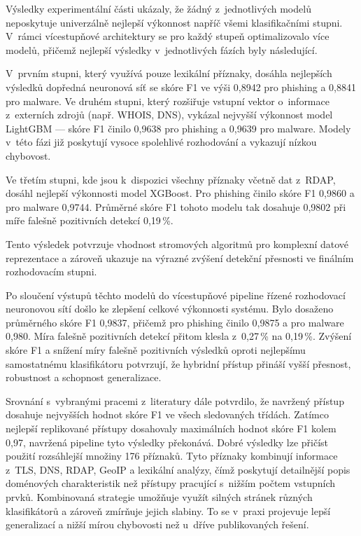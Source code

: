 Výsledky experimentální části ukázaly, že žádný z~jednotlivých modelů neposkytuje univerzálně nejlepší výkonnost napříč všemi klasifikačními stupni. V~rámci vícestupňové architektury se pro každý stupeň optimalizovalo více modelů, přičemž nejlepší výsledky v~jednotlivých fázích byly následující.

V~prvním stupni, který využívá pouze lexikální příznaky, dosáhla nejlepších výsledků dopředná neuronová síť se skóre F1 ve výši 0{,}8942 pro phishing a 0{,}8841 pro malware. Ve druhém stupni, který rozšiřuje vstupní vektor o~informace z~externích zdrojů (např. WHOIS, DNS), vykázal nejvyšší výkonnost model LightGBM — skóre F1 činilo 0{,}9638 pro phishing a 0{,}9639 pro malware. Modely v~této fázi již poskytují vysoce spolehlivé rozhodování a vykazují nízkou chybovost. 

Ve třetím stupni, kde jsou k~dispozici všechny příznaky včetně dat z~RDAP, dosáhl nejlepší výkonnosti model XGBoost. Pro phishing činilo skóre F1 0{,}9860 a pro malware 0{,}9744. Průměrné skóre F1 tohoto modelu tak dosahuje 0{,}9802 při míře falešně pozitivních detekcí 0{,}19\,\%.

Tento výsledek potvrzuje vhodnost stromových algoritmů pro komplexní datové reprezentace a zároveň ukazuje na výrazné zvýšení detekční přesnosti ve finálním rozhodovacím stupni.

Po sloučení výstupů těchto modelů do vícestupňové pipeline řízené rozhodovací neuronovou sítí došlo ke zlepšení celkové výkonnosti systému. Bylo dosaženo průměrného skóre F1 0{,}9837, přičemž pro phishing činilo 0{,}9875 a pro malware 0{,}980. Míra falešně pozitivních detekcí přitom klesla z~0{,}27\,\% na 0{,}19\,\%. Zvýšení skóre F1 a snížení míry falešně pozitivních výsledků oproti nejlepšímu samostatnému klasifikátoru potvrzují, že hybridní přístup přináší vyšší přesnost, robustnost a schopnost generalizace.

Srovnání s~vybranými pracemi z~literatury dále potvrdilo, že navržený přístup dosahuje nejvyšších hodnot skóre F1 ve všech sledovaných třídách. Zatímco nejlepší replikované přístupy dosahovaly maximálních hodnot skóre F1 kolem 0{,}97, navržená pipeline tyto výsledky překonává. Dobré výsledky lze přičíst použití rozsáhlejší množiny 176 příznaků. Tyto příznaky kombinují informace z~TLS, DNS, RDAP, GeoIP a lexikální analýzy, čímž poskytují detailnější popis doménových charakteristik než přístupy pracující s~nižším počtem vstupních prvků. Kombinovaná strategie umožňuje využít silných stránek různých klasifikátorů a zároveň zmírňuje jejich slabiny. To se v~praxi projevuje lepší generalizací a nižší mírou chybovosti než u~dříve publikovaných řešení.

